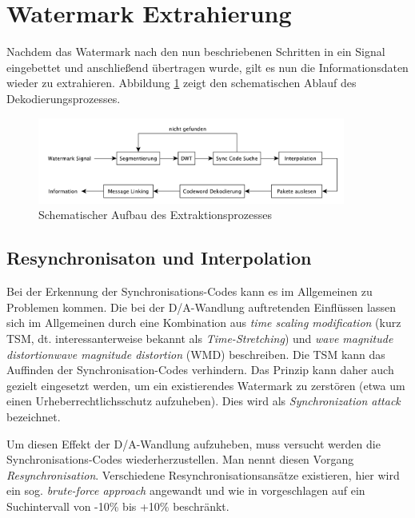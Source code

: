 \section{Watermark Extrahierung}
\label{sec:extraction}

Nachdem das Watermark nach den nun beschriebenen Schritten in ein Signal eingebettet und anschließend übertragen wurde, gilt es nun die Informationsdaten wieder zu extrahieren. Abbildung \ref{fig:diagram-decoder} zeigt den schematischen Ablauf des Dekodierungsprozesses.

\begin{figure}[h]
	\centering
	\includegraphics[width=0.9\textwidth]{figures/diagram-decoder-v2.pdf}
	\caption{Schematischer Aufbau des Extraktionsprozesses}
	\label{fig:diagram-decoder}
\end{figure}


\subsection{Resynchronisaton und Interpolation}

Bei der Erkennung der Synchronisations-Codes kann es im Allgemeinen zu Problemen kommen. Die bei der D/A-Wandlung auftretenden Einflüssen lassen sich im Allgemeinen durch eine Kombination aus \textit{time scaling modification} (kurz TSM, dt. interessanterweise bekannt als \textit{Time-Stretching}) und \textit{wave magnitude
distortion}\textit{wave magnitude
distortion} (WMD) beschreiben\cite{xiang2007robust}\cite{steinebach2002audio}. Die TSM kann das Auffinden der Synchronisation-Codes verhindern. Das Prinzip kann daher auch gezielt eingesetzt werden, um ein existierendes Watermark zu zerstören (etwa um einen Urheberrechtlichsschutz aufzuheben). Dies wird als \textit{Synchronization attack} bezeichnet.

Um diesen Effekt der D/A-Wandlung aufzuheben, muss versucht werden die Synchron\-isations\--Codes wieder\-herzustellen. Man nennt diesen Vorgang \textit{Resynchronisation}. Verschiedene Resynchronisationsansätze existieren, hier wird ein sog. \textit{brute-force approach} angewandt und wie in \cite{steinebach2011re} vorgeschlagen auf ein Suchintervall von -10\% bis +10\% beschränkt. 

